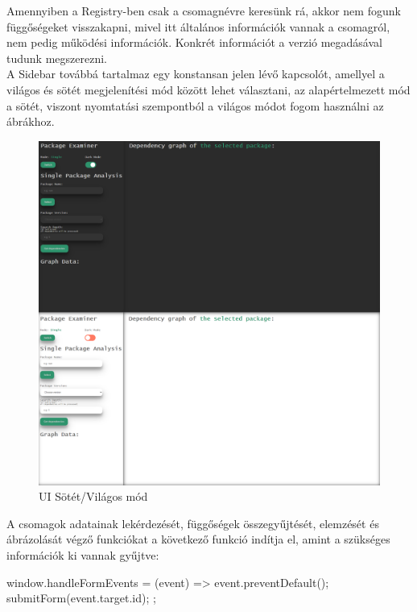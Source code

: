 Amennyiben a Registry-ben csak a csomagnévre keresünk rá, akkor nem fogunk függőségeket visszakapni, mivel itt általános információk vannak a csomagról, nem pedig működési információk. Konkrét információt a verzió megadásával tudunk megszerezni.\\

A Sidebar továbbá tartalmaz egy konstansan jelen lévő kapcsolót, amellyel a világos és sötét megjelenítési mód között lehet választani, az alapértelmezett mód a sötét, viszont nyomtatási szempontból a világos módot fogom használni az ábrákhoz. 

\begin{figure}[!h]
	\centering
	\includegraphics[scale=0.15]{images/ui_darkmode.png}
	\caption{UI Sötét/Világos mód}
	\label{fig:ui_darkmode}
\end{figure}

A csomagok adatainak lekérdezését, függőségek összegyűjtését, elemzését és ábrázolását végző funkciókat a következő funkció indítja el, amint a szükséges információk ki vannak gyűjtve:

\begin{js}
window.handleFormEvents = (event) => {
  event.preventDefault();
  submitForm(event.target.id);
};
\end{js}

\pagebreak

